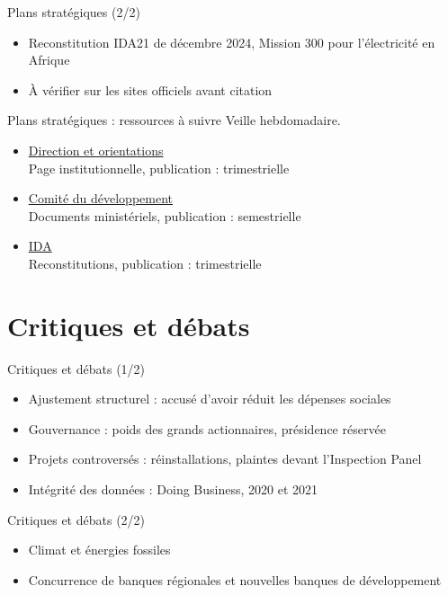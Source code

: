 \documentclass[aspectratio=169,11pt]{beamer}
\begin{document}
\begin{frame}{Plans stratégiques (2/2)}
\begin{itemize}
\item Reconstitution IDA21 de décembre 2024, Mission 300 pour l'électricité en Afrique
\item À vérifier sur les sites officiels avant citation
\end{itemize}
\end{frame}

\begin{frame}{Plans stratégiques : ressources à suivre}
\small
Veille hebdomadaire.
\begin{itemize}
\item \href{https://www.worldbank.org/en/about/leadership}{Direction et orientations}\\{\footnotesize Page institutionnelle, publication : trimestrielle}
\item \href{https://www.devcommittee.org}{Comité du développement}\\{\footnotesize Documents ministériels, publication : semestrielle}
\item \href{https://ida.worldbank.org}{IDA}\\{\footnotesize Reconstitutions, publication : trimestrielle}
\end{itemize}
\end{frame}

\section{Critiques et débats}
\begin{frame}{Critiques et débats (1/2)}
\begin{itemize}
\item Ajustement structurel : accusé d'avoir réduit les dépenses sociales
\item Gouvernance : poids des grands actionnaires, présidence réservée
\item Projets controversés : réinstallations, plaintes devant l'Inspection Panel
\item Intégrité des données : Doing Business, 2020 et 2021
\end{itemize}
\end{frame}

\begin{frame}{Critiques et débats (2/2)}
\begin{itemize}
\item Climat et énergies fossiles
\item Concurrence de banques régionales et nouvelles banques de développement
\end{itemize}
\end{frame}
\end{document}
